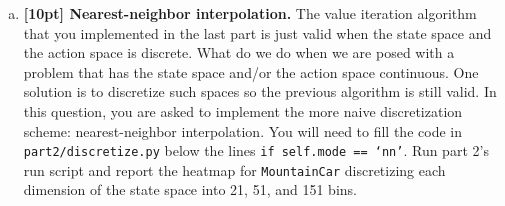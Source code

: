 \documentclass{article}
\begin{document}
\begin{enumerate}[(a)]

\item {\bf [10pt] Nearest-neighbor interpolation.} The value iteration algorithm that you implemented in the last part is just valid when the state space and the action space is discrete. What do we do when we are posed with a problem that has the state space and/or the action space continuous. One solution is to discretize such spaces so the previous algorithm is still valid. In this question, you are asked to implement the more naive discretization scheme: nearest-neighbor interpolation. You will need to fill the code in \texttt{part2/discretize.py} below the lines \texttt{if self.mode == `nn'}. Run part 2's run script and report the heatmap for \texttt{MountainCar} discretizing each dimension of the state space into 21, 51, and 151 bins.


\end{enumerate}
\end{document}
